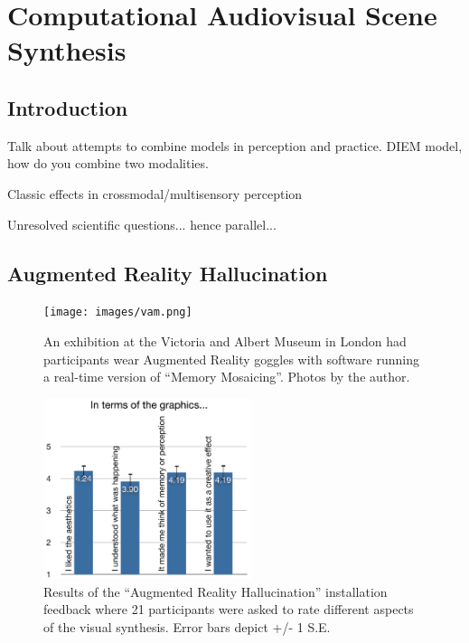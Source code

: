 \documentclass[a4paper,10pt,final]{ThesisStyle}
\begin{document}

\chapter{Computational Audiovisual Scene Synthesis}
\label{ch:audiovisual}
\minitoc

\section{Introduction}

Talk about attempts to combine models in perception and practice.   DIEM model, how do you combine two modalities.

Classic effects in crossmodal/multisensory perception

Unresolved scientific questions... hence parallel...

\section{Augmented Reality Hallucination}

\begin{figure}
  \centering
  \texttt{[image: images/vam.png]}
  \caption{An exhibition at the Victoria and Albert Museum in London had participants wear Augmented Reality goggles with software running a real-time version of ``Memory Mosaicing''.  Photos by the author.}
  \label{fig:vam}
\end{figure}
\begin{figure}
  \centering
  \includegraphics[width=2.4in]{images/vam-graphics-bar-resize-01.png}
  \caption{Results of the ``Augmented Reality Hallucination'' installation feedback where 21 participants were asked to rate different aspects of the visual synthesis.  Error bars depict +/- 1 S.E.}
  \label{fig:vam-graphics-bar}
\end{figure}
\end{document}
